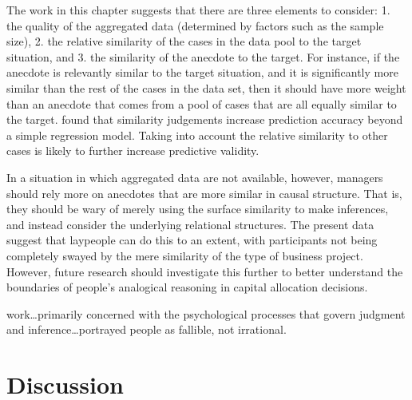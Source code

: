 \documentclass[a4paper, nobind, dvipsnames]{templates/ociamthesis}
\theoremstyle{definition}
\theoremstyle{definition}
\theoremstyle{definition}
\theoremstyle{definition}
\theoremstyle{remark}
\begin{document}
The work in this chapter suggests that there are three elements to consider: 1.
the quality of the aggregated data (determined by factors such as the sample
size), 2. the relative similarity of the cases in the data pool to the target
situation, and 3. the similarity of the anecdote to the target. For instance, if
the anecdote is relevantly similar to the target situation, and it is
significantly more similar than the rest of the cases in the data set, then it
should have more weight than an anecdote that comes from a pool of cases that
are all equally similar to the target. \textcite{lovallo2012} found that similarity
judgements increase prediction accuracy beyond a simple regression model. Taking
into account the relative similarity to other cases is likely to further
increase predictive validity.

In a situation in which aggregated data are not available, however, managers
should rely more on anecdotes that are more similar in causal structure. That
is, they should be wary of merely using the surface similarity to make
inferences, and instead consider the underlying relational structures. The
present data suggest that laypeople can do this to an extent, with participants
not being completely swayed by the mere similarity of the type of business
project. However, future research should investigate this further to better
understand the boundaries of people's analogical reasoning in capital allocation
decisions.

\newpage

\printbibliography[segment=\therefsegment,heading=subbibintoc]



\begin{savequote}
work\ldots primarily concerned with the psychological processes that
govern judgment and inference\ldots portrayed people as fallible, not
irrational.
\end{savequote}

\hypertarget{discussion}{%
\chapter{Discussion}\label{discussion}}

\minitoc
\end{document}
